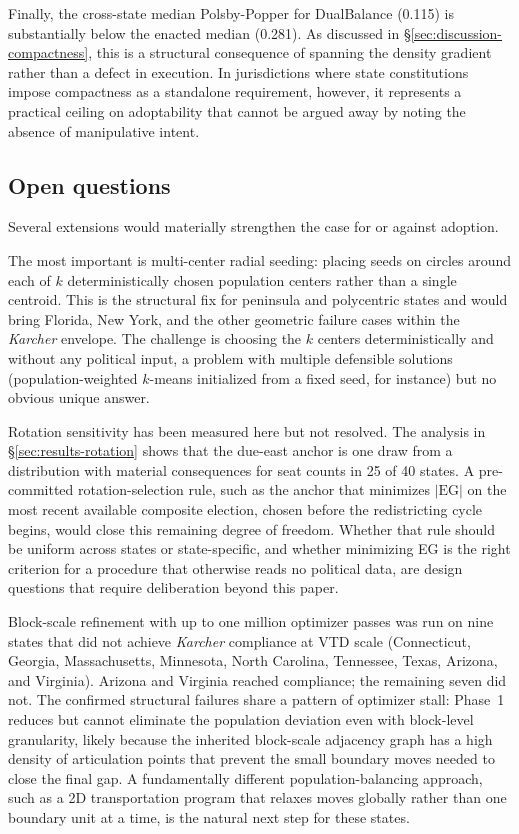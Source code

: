 Finally, the cross-state median Polsby-Popper for DualBalance
(0.115) is substantially below the enacted median (0.281). As
discussed in \S\ref{sec:discussion-compactness}, this is a
structural consequence of spanning the density gradient rather than
a defect in execution. In jurisdictions where state constitutions
impose compactness as a standalone requirement, however, it
represents a practical ceiling on adoptability that cannot be
argued away by noting the absence of manipulative intent.

\subsection{Open questions}
\label{sec:future-work}

Several extensions would materially strengthen the case for or
against adoption.

The most important is multi-center radial seeding: placing seeds on
circles around each of $k$ deterministically chosen population
centers rather than a single centroid. This is the structural fix
for peninsula and polycentric states and would bring Florida, New
York, and the other geometric failure cases within the \textit{Karcher}
envelope. The challenge is choosing the $k$ centers deterministically
and without any political input, a problem with multiple defensible
solutions (population-weighted $k$-means initialized from a fixed
seed, for instance) but no obvious unique answer.

Rotation sensitivity has been measured here but not resolved. The
analysis in \S\ref{sec:results-rotation} shows that the due-east
anchor is one draw from a distribution with material consequences
for seat counts in 25 of 40 states. A pre-committed rotation-selection
rule, such as the anchor that minimizes $|\mathrm{EG}|$ on the most
recent available composite election, chosen before the redistricting
cycle begins, would close this remaining degree of freedom. Whether
that rule should be uniform across states or state-specific, and
whether minimizing EG is the right criterion for a procedure that
otherwise reads no political data, are design questions that require
deliberation beyond this paper.

Block-scale refinement with up to one million optimizer passes was
run on nine states that did not achieve \textit{Karcher} compliance
at VTD scale (Connecticut, Georgia, Massachusetts, Minnesota, North
Carolina, Tennessee, Texas, Arizona, and Virginia). Arizona and
Virginia reached compliance; the remaining seven did not. The confirmed structural
failures share a pattern of optimizer stall: Phase~1 reduces but
cannot eliminate the population deviation even with block-level
granularity, likely because the inherited block-scale adjacency graph
has a high density of articulation points that prevent the small
boundary moves needed to close the final gap. A fundamentally
different population-balancing approach, such as a 2D transportation
program that relaxes moves globally rather than one boundary unit at
a time, is the natural next step for these states.

